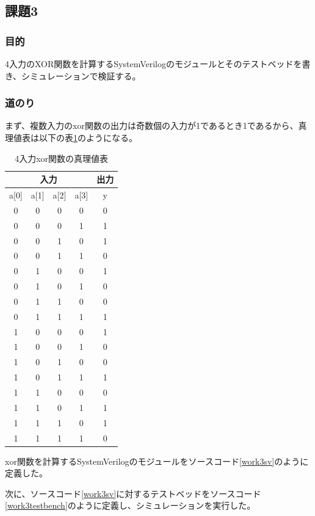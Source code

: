 \documentclass[a4paper]{jarticle}
\begin{document}
\subsection{課題3}
\subsubsection{目的}
4入力のXOR関数を計算するSystemVerilogのモジュールとそのテストベッドを書き、シミュレーションで検証する。
\subsubsection{道のり}
まず、複数入力のxor関数の出力は奇数個の入力が1であるとき1であるから、真理値表は以下の表\ref{Work3TruthTable}のようになる。
\begin{table}[ht]
	\begin{center}
		\caption{4入力xor関数の真理値表}
		\label{Work3TruthTable}
		\begin{tabular}{|c|c|c|c||c|}
			\hline
			\multicolumn{4}{|c|}{入力} & \multicolumn{1}{|c|}{出力}\\ \hline\hline
			a[0]	&a[1]	&a[2]	&a[3]	&y\\	\hline\hline
			0	&0	&0	&0	&0\\	\hline
			0	&0	&0	&1	&1\\	\hline
			0	&0	&1	&0	&1\\	\hline
			0	&0	&1	&1	&0\\	\hline
			0	&1	&0	&0	&1\\	\hline
			0	&1	&0	&1	&0\\	\hline
			0	&1	&1	&0	&0\\	\hline
			0	&1	&1	&1	&1\\	\hline
			1	&0	&0	&0	&1\\	\hline
			1	&0	&0	&1	&0\\	\hline
			1	&0	&1	&0	&0\\	\hline
			1	&0	&1	&1	&1\\	\hline
			1	&1	&0	&0	&0\\	\hline
			1	&1	&0	&1	&1\\	\hline
			1	&1	&1	&0	&1\\	\hline
			1	&1	&1	&1	&0\\	\hline
		\end{tabular}
	\end{center}
\end{table}
xor関数を計算するSystemVerilogのモジュールをソースコード\ref{work3sv}のように定義した。

次に、ソースコード\ref{work3sv}に対するテストベッドをソースコード\ref{work3testbench}のように定義し、シミュレーションを実行した。

\end{document}
